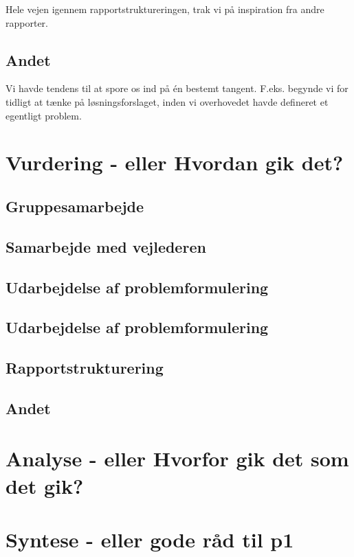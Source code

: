Hele vejen igennem rapportstruktureringen, trak vi på inspiration fra andre rapporter.

\subsection{Andet}


Vi havde tendens til at spore os ind på én bestemt tangent. F.eks. begynde vi for tidligt at tænke på løsningsforslaget, inden vi overhovedet havde defineret et egentligt problem.



\section{Vurdering - eller Hvordan gik det?}

\subsection{Gruppesamarbejde}

\subsection{Samarbejde med vejlederen}

\subsection{Udarbejdelse af problemformulering}


\subsection{Udarbejdelse af problemformulering}

\subsection{Rapportstrukturering}

\subsection{Andet}

\section{Analyse - eller Hvorfor gik det som det gik?}



\section{Syntese - eller gode råd til p1}








